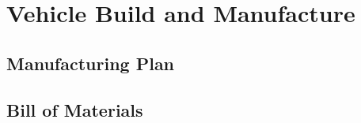 \section{Vehicle Build and Manufacture}
  \subsection{Manufacturing Plan}
  \subsection{Bill of Materials}